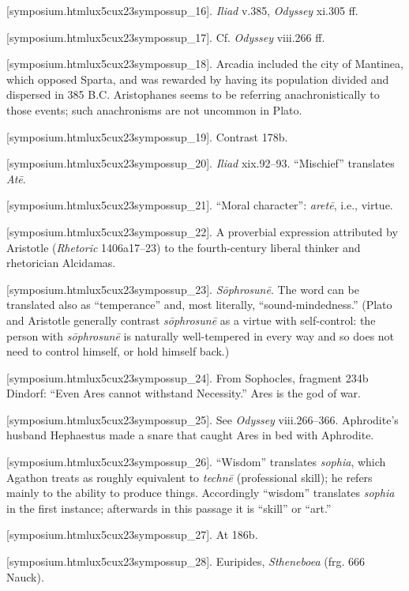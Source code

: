 [symposium.htmlux5cux23sympossup_16]. {\em Iliad} v.385,
{\em Odyssey} xi.305 ff.

[symposium.htmlux5cux23sympossup_17]. Cf. {\em Odyssey}
viii.266 ff.

[symposium.htmlux5cux23sympossup_18]. Arcadia included the city
of Mantinea, which opposed Sparta, and was rewarded by having its
population divided and dispersed in 385 B.C. Aristophanes seems to be
referring anachronistically to those events; such anachronisms are not
uncommon in Plato.

[symposium.htmlux5cux23sympossup_19]. Contrast 178b.

[symposium.htmlux5cux23sympossup_20]. {\em Iliad} xix.92--93.
“Mischief” translates {\em Atē}.

[symposium.htmlux5cux23sympossup_21]. “Moral character”:
{\em aretē}, i.e., virtue.

[symposium.htmlux5cux23sympossup_22]. A proverbial expression
attributed by Aristotle ({\em Rhetoric} 1406a17--23) to the
fourth-century liberal thinker and rhetorician Alcidamas.

[symposium.htmlux5cux23sympossup_23]. {\em Sōphrosunē}. The
word can be translated also as “temperance” and, most literally,
“sound-mindedness.” (Plato and Aristotle generally contrast
{\em sōphrosunē} as a virtue with self-control: the person with
{\em sōphrosunē} is naturally well-tempered in every way and so does not
need to control himself, or hold himself back.)

[symposium.htmlux5cux23sympossup_24]. From Sophocles, fragment
234b Dindorf: “Even Ares cannot withstand Necessity.” Ares is the god of
war.

[symposium.htmlux5cux23sympossup_25]. See {\em Odyssey}
viii.266--366. Aphrodite's husband Hephaestus made a snare that caught
Ares in bed with Aphrodite.

[symposium.htmlux5cux23sympossup_26]. “Wisdom” translates
{\em sophia}, which Agathon treats as roughly equivalent to {\em technē}
(professional skill); he refers mainly to the ability to produce things.
Accordingly “wisdom” translates {\em sophia} in the first instance;
afterwards in this passage it is “skill” or “art.”

[symposium.htmlux5cux23sympossup_27]. At 186b.

[symposium.htmlux5cux23sympossup_28]. Euripides,
{\em Stheneboea} (frg. 666 Nauck).

